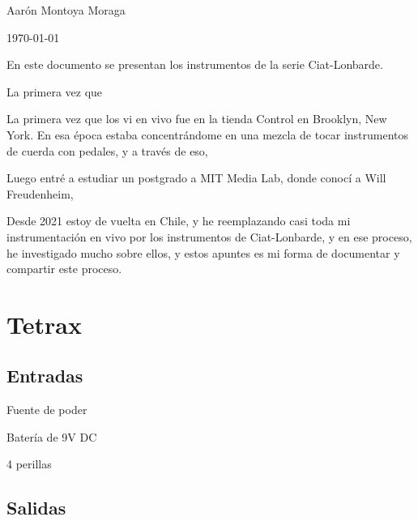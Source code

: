 
\begin{titlepage}
	\centering
	\vspace{1cm}
	\vspace{1.5cm}
    \vfill
	{\huge\bfseries \docTitle\par}
	\vspace{2cm}
	{\Large Aarón Montoya Moraga\par}
    \vfill
	{\large \today\par}
\end{titlepage}

\newpage

\tableofcontents

\newpage

\introText

En este documento se presentan los instrumentos de la serie Ciat-Lonbarde.

La primera vez que 

La primera vez que los vi en vivo fue en la tienda Control en Brooklyn, New York. En esa época estaba concentrándome en una mezcla de tocar instrumentos de cuerda con pedales, y a través de eso, 

Luego entré a estudiar un postgrado a MIT Media Lab, donde conocí a Will Freudenheim, 

Desde 2021 estoy de vuelta en Chile, y he reemplazando casi toda mi instrumentación en vivo por los instrumentos de Ciat-Lonbarde, y en ese proceso, he investigado mucho sobre ellos, y estos apuntes es mi forma de documentar y compartir este proceso.

\newpage

\chapter{Tetrax}

\introTetrax

\section{Entradas}

Fuente de poder

Batería de 9V DC

4 perillas

\section{Salidas}


